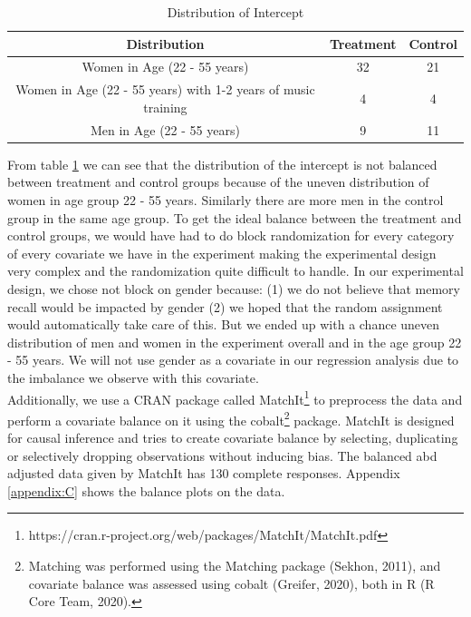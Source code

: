 \documentclass[journal,onecolumn, 12pt]{article}
\begin{document}
\begin{table}[h]
\begin{center}
 \begin{tabular}{||c| c c||} 
 \hline
 Distribution & Treatment & Control \\  
 \hline\hline
 Women in Age (22 - 55 years) & 32 & 21 \\ \hline
 Women in Age (22 - 55 years) with 1-2 years of music training & 4 & 4 \\ \hline
 Men in Age (22 - 55 years) & 9 & 11 \\ \hline
\end{tabular}
\caption{Distribution of Intercept}
\label{table: intercept}
\end{center}
\end{table}

\noindent
From table \ref{table: intercept} we can see that the distribution of the intercept is not balanced between treatment and control groups because of the uneven distribution of women in age group 22 - 55 years. Similarly there are more men in the control group in the same age group. To get the ideal balance between the treatment and control groups, we would have had to do block randomization for every category of every covariate we have in the experiment making the experimental design very complex and the randomization quite difficult to handle. In our experimental design, we chose not block on gender because: (1) we do not believe that memory recall would be impacted by gender (2) we hoped that the random assignment would automatically take care of this. But we ended up with a chance uneven distribution of men and women in the experiment overall and in the age group 22 - 55 years. We will not use gender as a covariate in our regression analysis due to the imbalance we observe with this covariate. \\

\noindent
Additionally, we use a CRAN package called MatchIt\footnote{https://cran.r-project.org/web/packages/MatchIt/MatchIt.pdf} to preprocess the data and perform a covariate balance on it using the cobalt\footnote {Matching was performed using the Matching package (Sekhon, 2011), and covariate balance was assessed using cobalt (Greifer, 2020), both in R (R Core Team, 2020).} package. MatchIt is designed for causal inference and tries to create covariate balance by selecting, duplicating or selectively dropping observations without inducing bias. The balanced abd adjusted data given by MatchIt has 130 complete responses. Appendix \ref{appendix:C} shows the balance plots on the data. 
\end{document}
